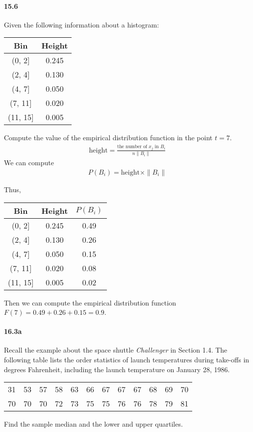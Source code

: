 \documentclass{article} %
\begin{document}
\paragraph*{15.6} Given the following information about a histogram:
\begin{table}[h!]
\centering
\begin{tabular}{cc} \\ \hline \hline 
Bin & Height \\ \hline 
(0, 2] & 0.245 \\
(2, 4] & 0.130 \\
(4, 7] & 0.050 \\
(7, 11] & 0.020 \\
(11, 15] & 0.005 \\ 
\hline \hline
\end{tabular}
\end{table}
Compute the value of the empirical distribution function in the point $t = 7$. 
\begin{align*}
\text{height} = \frac{\text{the number of } x_j \text{ in } B_i}{n\|B_i\|}
\end{align*}
We can compute 
\begin{align*}
P(B_i) = \text{height} \times \|B_i\|
\end{align*}

Thus, 
\begin{table}[h!]
\centering
\begin{tabular}{ccc} \\ \hline \hline 
Bin & Height & $P(B_i)$ \\ \hline 
(0, 2] & 0.245 & 0.49\\
(2, 4] & 0.130 & 0.26 \\
(4, 7] & 0.050 & 0.15 \\
(7, 11] & 0.020 & 0.08 \\
(11, 15] & 0.005 & 0.02 \\ 
\hline \hline
\end{tabular}
\end{table}
Then we can compute the empirical distribution function 
$F(7) = 0.49 + 0.26 + 0.15 = 0.9$. 


\paragraph*{16.3a} Recall the example about the space shuttle {\it Challenger} in Section 1.4. The following table lists the order statistics of launch temperatures during take-offs in degrees Fahrenheit, including the launch temperature on January 28, 1986. 
\begin{table}[h!]
\centering
\begin{tabular}{cccccccccccc}  \hline
31 & 53 & 57 & 58 & 63 & 66 & 67 & 67 & 67 & 68 & 69 & 70 \\ 
70 & 70 & 70 & 72 & 73 & 75 & 75 & 76 & 76 & 78 & 79 & 81  \\ \hline
\end{tabular}
\end{table}
Find the sample median and the lower and upper quartiles. 
\end{document}
